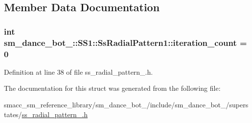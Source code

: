 \subsection{Member Data Documentation}
\subsubsection[{\texorpdfstring{iteration\+\_\+count}{iteration_count}}]{\setlength{\rightskip}{0pt plus 5cm}int sm\+\_\+dance\+\_\+bot\+\_\+::\+S\+S1\+::\+Ss\+Radial\+Pattern1\+::iteration\+\_\+count = 0}\hypertarget{structsm__dance__bot__3_1_1SS1_1_1SsRadialPattern1_a65f1fba9b7a18750484142c533514a70}{}\label{structsm__dance__bot__3_1_1SS1_1_1SsRadialPattern1_a65f1fba9b7a18750484142c533514a70}


Definition at line 38 of file ss\+\_\+radial\+\_\+pattern\+\_.\+h.



The documentation for this struct was generated from the following file\+:\begin{DoxyCompactItemize}
\item 
smacc\+\_\+sm\+\_\+reference\+\_\+library/sm\+\_\+dance\+\_\+bot\+\_/include/sm\+\_\+dance\+\_\+bot\+\_/superstates/\hyperlink{3_2include_2sm__dance__bot__3_2superstates_2ss__radial__pattern__1_8h}{ss\+\_\+radial\+\_\+pattern\+\_.\+h}\end{DoxyCompactItemize}

